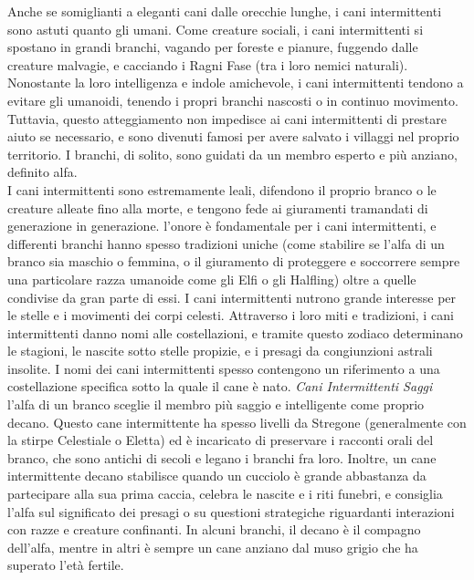 \begin{multicols}{2}
Anche se somiglianti a eleganti cani dalle orecchie lunghe, i cani intermittenti sono astuti quanto gli umani. Come creature sociali, i cani intermittenti si spostano in grandi branchi, vagando per foreste e pianure, fuggendo dalle creature malvagie, e cacciando i Ragni Fase (tra i loro nemici naturali). Nonostante la loro intelligenza e indole amichevole, i cani intermittenti tendono a evitare gli umanoidi, tenendo i propri branchi nascosti o in continuo movimento. Tuttavia, questo atteggiamento non impedisce ai cani intermittenti di prestare aiuto se necessario, e sono divenuti famosi per avere salvato i villaggi nel proprio territorio. I branchi, di solito, sono guidati da un membro esperto e più anziano, definito alfa.\\

I cani intermittenti sono estremamente leali, difendono il proprio branco o le creature alleate fino alla morte, e tengono fede ai giuramenti tramandati di generazione in generazione. l'onore è fondamentale per i cani intermittenti, e differenti branchi hanno spesso tradizioni uniche (come stabilire se l'alfa di un branco sia maschio o femmina, o il giuramento di proteggere e soccorrere sempre una particolare razza umanoide come gli Elfi o gli Halfling) oltre a quelle condivise da gran parte di essi. I cani intermittenti nutrono grande interesse per le stelle e i movimenti dei corpi celesti. Attraverso i loro miti e tradizioni, i cani intermittenti danno nomi alle costellazioni, e tramite questo zodiaco determinano le stagioni, le nascite sotto stelle propizie, e i presagi da congiunzioni astrali insolite. I nomi dei cani intermittenti spesso contengono un riferimento a una costellazione specifica sotto la quale il cane è nato.
\textit{Cani Intermittenti Saggi}\\

l'alfa di un branco sceglie il membro più saggio e intelligente come proprio decano. Questo cane intermittente ha spesso livelli da Stregone (generalmente con la stirpe Celestiale o Eletta) ed è incaricato di preservare i racconti orali del branco, che sono antichi di secoli e legano i branchi fra loro. Inoltre, un cane intermittente decano stabilisce quando un cucciolo è grande abbastanza da partecipare alla sua prima caccia, celebra le nascite e i riti funebri, e consiglia l'alfa sul significato dei presagi o su questioni strategiche riguardanti interazioni con razze e creature confinanti. In alcuni branchi, il decano è il compagno dell'alfa, mentre in altri è sempre un cane anziano dal muso grigio che ha superato l'età fertile. \\


\end{multicols}
